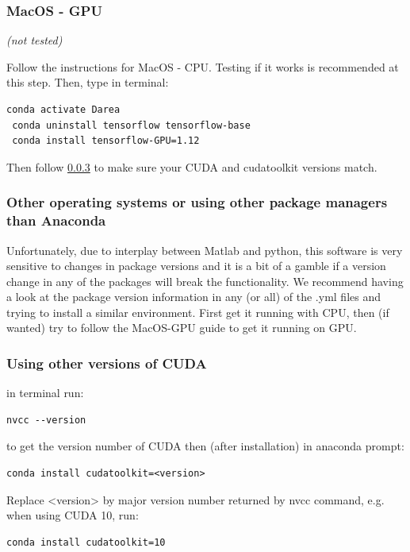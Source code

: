 \documentclass[12pt, a4paper]{scrartcl}
\begin{document}
\subsubsection{MacOS - GPU}
\textit{(not tested)}

Follow the instructions for MacOS - CPU. Testing if it works is recommended at this step. Then, type in terminal:
\begin{lstlisting}[belowskip=0pt]
 conda activate Darea
 conda uninstall tensorflow tensorflow-base
 conda install tensorflow-GPU=1.12
\end{lstlisting}
Then follow \ref{cuda_ver} to make sure your CUDA and cudatoolkit versions match.
\subsubsection{Other operating systems or using other package managers than Anaconda}
Unfortunately, due to interplay between Matlab and python, this software is very sensitive to changes in package versions and it is a bit of a gamble if a version change in any of the packages will break the functionality. We recommend having a look at the package version information in any (or all) of the .yml files and trying to install a similar environment.
First get it running with CPU, then (if wanted) try to follow the MacOS-GPU guide to get it running on GPU.
\subsubsection{Using other versions of CUDA}
\label{cuda_ver}
in terminal run: 
\begin{lstlisting}[belowskip=0pt]
 nvcc --version 
\end{lstlisting}
to get the version number of CUDA
then (after installation) in anaconda prompt:
\begin{lstlisting}[belowskip=0pt]
 conda install cudatoolkit=<version>
\end{lstlisting}
Replace <version> by major version number returned by nvcc command, e.g. when using CUDA 10, run:
\begin{lstlisting}[belowskip=0pt]
 conda install cudatoolkit=10 
\end{lstlisting}
\end{document}
